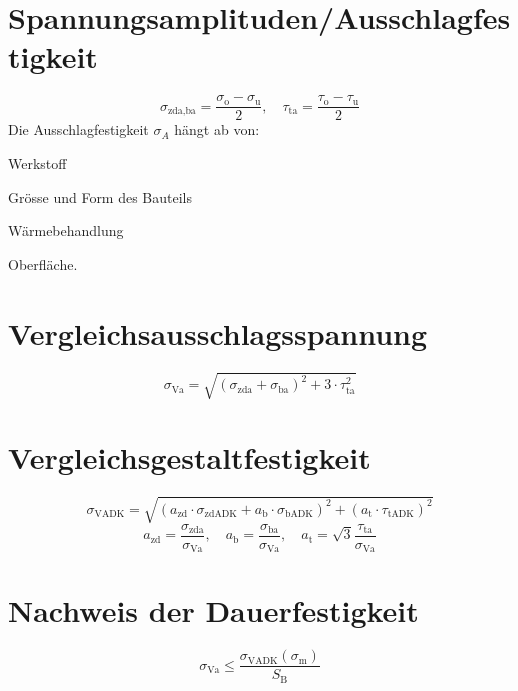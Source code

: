 \section{Spannungsamplituden/Ausschlagfestigkeit} %
	\begin{equation*}
		\sigma_{\text{zda,ba}} = \frac{\sigma_{\text{o}}-\sigma_{\text{u}}}{2}, \quad \tau_{\text{ta}}= \frac{\tau_{\text{o}}-\tau_{\text{u}}}{2}
	\end{equation*}
	Die Ausschlagfestigkeit $\sigma_A$ hängt ab von:
	\begin{tightitemize}
		\item Werkstoff
		\item Grösse und Form des Bauteils
		\item Wärmebehandlung
		\item Oberfläche.
	\end{tightitemize}
\section{Vergleichsausschlagsspannung} %
	\begin{equation*}
		\sigma_{\text{Va}}= \sqrt{(\sigma_{\text{zda}}+\sigma_{\text{ba}})^2 + 3 \cdot \tau_{\text{ta}}^2}
	\end{equation*}
\section{Vergleichsgestaltfestigkeit} %
	\begin{equation*}
		\sigma_{\text{VADK}} = \sqrt{(a_{\text{zd}}\cdot\sigma_{\text{zdADK}}+a_{\text{b}}\cdot\sigma_{\text{bADK}})^2 + (a_{\text{t}}\cdot\tau_{\text{tADK}})^2}
	\end{equation*}
	\begin{equation*}
		a_{\text{zd}}=\frac{\sigma_{\text{zda}}}{\sigma_{\text{Va}}}, \quad a_{\text{b}}=\frac{\sigma_{\text{ba}}}{\sigma_{\text{Va}}}, \quad a_{\text{t}}=\sqrt{3}\frac{\tau_{\text{ta}}}{\sigma_{\text{Va}}}
	\end{equation*}
\section{Nachweis der Dauerfestigkeit} %
	\begin{equation*}
		\sigma_\text{Va} \leq \frac{\sigma_\text{VADK}(\sigma_\text{m})}{S_\text{B}}
	\end{equation*}
